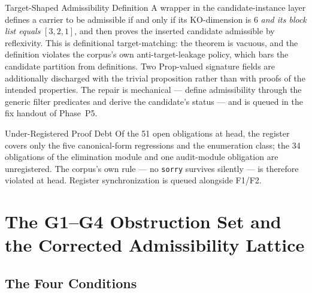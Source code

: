 \documentclass[12pt,a4paper,twoside]{article}
\theoremstyle{plain}
\theoremstyle{definition}
\theoremstyle{remark}
\begin{document}
\begin{probbox}{Target-Shaped Admissibility Definition}
A wrapper in the candidate-instance layer defines a carrier to be
admissible if and only if its KO-dimension is $6$ \emph{and its block list
equals} $[3,2,1]$, and then proves the inserted candidate admissible by
reflexivity. This is definitional target-matching: the theorem is vacuous,
and the definition violates the corpus's own anti-target-leakage policy,
which bars the candidate partition from definitions. Two Prop-valued
signature fields are additionally discharged with the trivial proposition
rather than with proofs of the intended properties. The repair is
mechanical --- define admissibility through the generic filter predicates
and derive the candidate's status --- and is queued in the fix handout of
Phase~P5.
\end{probbox}

\begin{probbox}{Under-Registered Proof Debt}
Of the 51 open obligations at head, the register covers only the five
canonical-form regressions and the enumeration class; the 34 obligations
of the elimination module and one audit-module obligation are
unregistered. The corpus's own rule --- no \texttt{sorry} survives
silently --- is therefore violated at head. Register synchronization is
queued alongside F1/F2.
\end{probbox}

\section{The G1--G4 Obstruction Set and the Corrected Admissibility Lattice}
\label{sec:g1g4}

\subsection{The Four Conditions}
\label{subsec:g1g4-statement}
\end{document}
